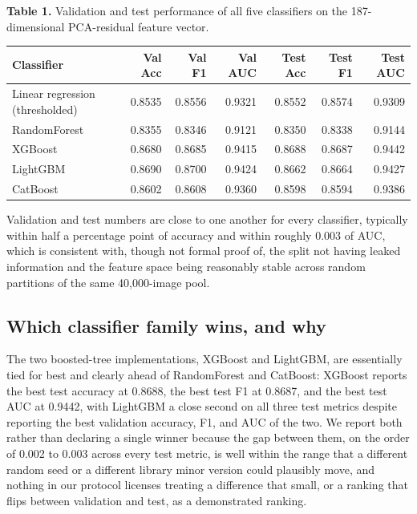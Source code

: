 \documentclass[11pt]{article}
\begin{document}
\vspace{0.5em}
\noindent\textbf{Table 1.} Validation and test performance of all five classifiers on the 187-dimensional PCA-residual feature vector.
\vspace{0.5em}

\begin{center}
\begin{tabular}{@{}l r r r r r r@{}}
\toprule
Classifier & Val Acc & Val F1 & Val AUC & Test Acc & Test F1 & Test AUC \\
\midrule
Linear regression (thresholded) & 0.8535 & 0.8556 & 0.9321 & 0.8552 & 0.8574 & 0.9309 \\
RandomForest & 0.8355 & 0.8346 & 0.9121 & 0.8350 & 0.8338 & 0.9144 \\
XGBoost & 0.8680 & 0.8685 & 0.9415 & 0.8688 & 0.8687 & 0.9442 \\
LightGBM & 0.8690 & 0.8700 & 0.9424 & 0.8662 & 0.8664 & 0.9427 \\
CatBoost & 0.8602 & 0.8608 & 0.9360 & 0.8598 & 0.8594 & 0.9386 \\
\bottomrule
\end{tabular}
\end{center}
\vspace{0.5em}

Validation and test numbers are close to one another for every classifier, typically within half a percentage point of accuracy and within roughly 0.003 of AUC, which is consistent with, though not formal proof of, the split not having leaked information and the feature space being reasonably stable across random partitions of the same 40,000-image pool.

\subsection{Which classifier family wins, and why}

The two boosted-tree implementations, XGBoost and LightGBM, are essentially tied for best and clearly ahead of RandomForest and CatBoost: XGBoost reports the best test accuracy at 0.8688, the best test F1 at 0.8687, and the best test AUC at 0.9442, with LightGBM a close second on all three test metrics despite reporting the best validation accuracy, F1, and AUC of the two. We report both rather than declaring a single winner because the gap between them, on the order of 0.002 to 0.003 across every test metric, is well within the range that a different random seed or a different library minor version could plausibly move, and nothing in our protocol licenses treating a difference that small, or a ranking that flips between validation and test, as a demonstrated ranking.
\end{document}
